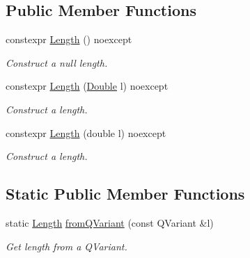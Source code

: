 \subsection*{Public Member Functions}
\begin{DoxyCompactItemize}
\item 
constexpr \hyperlink{class_mdt_1_1_numeric_1_1_length_a7ad7b263b98b280ba6d383edc260d2a5}{Length} () noexcept\hypertarget{class_mdt_1_1_numeric_1_1_length_a7ad7b263b98b280ba6d383edc260d2a5}{}\label{class_mdt_1_1_numeric_1_1_length_a7ad7b263b98b280ba6d383edc260d2a5}

\begin{DoxyCompactList}\small\item\em Construct a null length. \end{DoxyCompactList}\item 
constexpr \hyperlink{class_mdt_1_1_numeric_1_1_length_a7d7b7aa5f63272a62870dbe782af0adb}{Length} (\hyperlink{class_mdt_1_1_numeric_1_1_double}{Double} l) noexcept\hypertarget{class_mdt_1_1_numeric_1_1_length_a7d7b7aa5f63272a62870dbe782af0adb}{}\label{class_mdt_1_1_numeric_1_1_length_a7d7b7aa5f63272a62870dbe782af0adb}

\begin{DoxyCompactList}\small\item\em Construct a length. \end{DoxyCompactList}\item 
constexpr \hyperlink{class_mdt_1_1_numeric_1_1_length_abc975577596b9b57d134ef814ff6a0e4}{Length} (double l) noexcept\hypertarget{class_mdt_1_1_numeric_1_1_length_abc975577596b9b57d134ef814ff6a0e4}{}\label{class_mdt_1_1_numeric_1_1_length_abc975577596b9b57d134ef814ff6a0e4}

\begin{DoxyCompactList}\small\item\em Construct a length. \end{DoxyCompactList}\end{DoxyCompactItemize}
\subsection*{Static Public Member Functions}
\begin{DoxyCompactItemize}
\item 
static \hyperlink{class_mdt_1_1_numeric_1_1_length}{Length} \hyperlink{class_mdt_1_1_numeric_1_1_length_ad4e60674e598aa2dcaec5080b0657e24}{from\+Q\+Variant} (const Q\+Variant \&l)
\begin{DoxyCompactList}\small\item\em Get length from a Q\+Variant. \end{DoxyCompactList}\end{DoxyCompactItemize}


